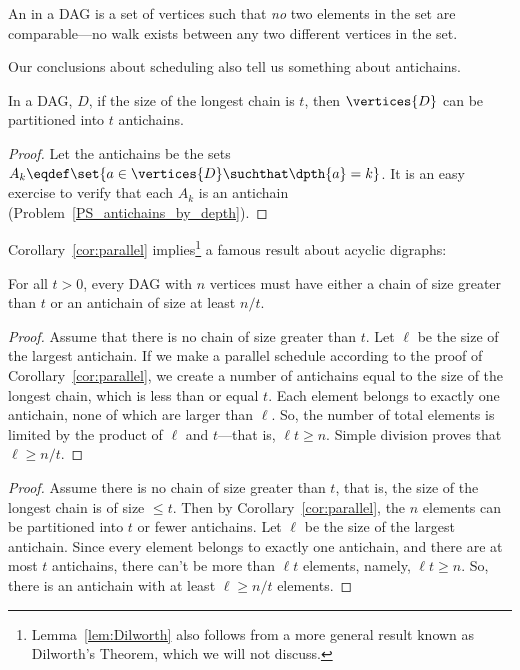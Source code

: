 \begin{definition}
An  in a DAG is a set of vertices such that \emph{no}
two elements in the set are comparable---no walk exists between any
two different vertices in the set.
\end{definition}

Our conclusions about scheduling also tell us something about antichains.

\begin{corollary}\label{cor:parallel}
In a DAG, $D$, if the size of the longest chain is $t$, then
$\vertices{D}$ can be partitioned into $t$ antichains.
\end{corollary}

\begin{proof}
Let the antichains be the sets $A_k \eqdef \set{a \in \vertices{D}
  \suchthat \dpth{a} =k}$.  It is an easy exercise to verify that each
$A_k$ is an antichain (Problem~\ref{PS_antichains_by_depth}).
\end{proof}

Corollary~\ref{cor:parallel} implies\footnote{Lemma~\ref{lem:Dilworth}
  also follows from a more general result known as Dilworth's Theorem,
  which we will not discuss.} a famous result about acyclic digraphs:

\begin{lemma}[Dilworth]\label{lem:Dilworth}
For all $t>0$, every DAG with $n$ vertices must have either a chain of
size greater than $t$ or an antichain of size at least $n / t$.
\end{lemma}

\begin{proof}
Assume that there is no chain of size greater than $t$. Let $\ell$ be
the size of the largest antichain.  If we make a parallel schedule
according to the proof of Corollary~\ref{cor:parallel}, we create a
number of antichains equal to the size of the longest chain, which is
less than or equal $t$.  Each element belongs to exactly one antichain,
none of which are larger than $\ell$. So, the number of total elements
is limited by the product of $\ell$ and $t$---that is, $\ell t \geq
n$. Simple division proves that $\ell \geq n/t$.
\end{proof}

\begin{editingnotes}
\begin{proof}
Assume there is no chain of size greater than $t$, that is, the size of the
longest chain is of size $\leq t$.  Then by
Corollary~\ref{cor:parallel}, the $n$ elements can be partitioned into
$t$ or fewer antichains.  Let $\ell$ be the size of the largest
antichain.  Since every element belongs to exactly one antichain, and
there are at most $t$ antichains, there can't be more than $\ell t$
elements, namely, $\ell t \geq n$.  So, there is an antichain with at
least $\ell \geq n / t$ elements.
\end{proof}
\end{editingnotes}

